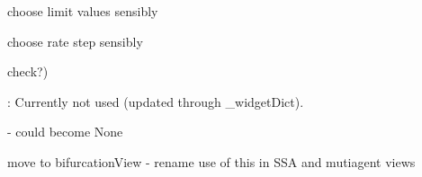 \begin{DoxyRefList}
choose limit values sensibly 

choose rate step sensibly  
\item[\label{todo__todo000025}%
\Hypertarget{todo__todo000025}%
Global \hyperlink{class_mu_mo_t_1_1_mu_mo_tmulti_controller_a27dd8543b5188cdfe40f622d267fe2c5}{Mu\+Mo\+Tmulti\+Controller.\+\_\+view} ]check?)  
\item[\label{todo__todo000052}%
\Hypertarget{todo__todo000052}%
Global \hyperlink{class_mu_mo_t_1_1_mu_mo_t_s_s_a_view_a5feff4ca83ee97d6e09874496a4975d4}{Mu\+Mo\+T\+S\+S\+A\+View.\+\_\+plot\+Type} ]\+: Currently not used (updated through \+\_\+widget\+Dict). 
\item[\label{todo__todo000020}%
\Hypertarget{todo__todo000020}%
Global \hyperlink{class_mu_mo_t_1_1_mu_mo_tview_a15f56ca9811d1e67d721fa64f9b0dc1e}{Mu\+Mo\+Tview.\+\_\+controller} ]-\/ could become None  
\item[\label{todo__todo000021}%
\Hypertarget{todo__todo000021}%
Global \hyperlink{class_mu_mo_t_1_1_mu_mo_tview_a5feff4ca83ee97d6e09874496a4975d4}{Mu\+Mo\+Tview.\+\_\+plot\+Type} ]move to bifurcation\+View -\/ rename use of this in S\+SA and mutiagent views 
\end{DoxyRefList}